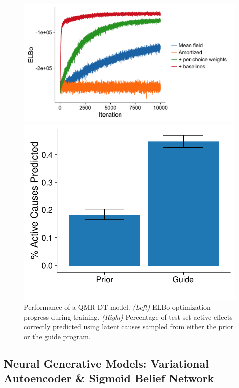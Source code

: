 \begin{figure}[!ht]
\begin{minipage}{0.6\linewidth}
\centering
\includegraphics[width=\linewidth]{figs/results/qmr/elboProgress.png}
\end{minipage}
%
\begin{minipage}{0.4\linewidth}
\centering
\includegraphics[width=\linewidth]{figs/results/qmr/reconstructScores.pdf}
\end{minipage}
\caption{Performance of a QMR-DT model. \emph{(Left)} ELBo optimization progress during training. \emph{(Right)} Percentage of test set active effects correctly predicted using latent causes sampled from either the prior or the guide program.}
\label{fig:qmrResults}
\end{figure}


\subsection{Neural Generative Models: Variational Autoencoder \& Sigmoid Belief Network}
\label{sec:results_vae}

